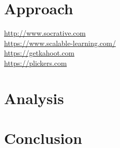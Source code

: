 \documentclass{article}
\begin{document}
\section{Approach} %
\label{sec:plan}

\url{http://www.socrative.com}\\
\url{https://www.scalable-learning.com/}\\ %
\url{https://getkahoot.com}\\
\url{https://plickers.com}

\section{Analysis} %
\label{sec:analysis}


\section{Conclusion} %
\label{sec:conclusion}

\end{document}
